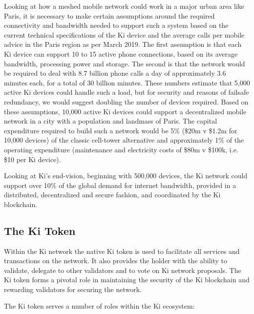 Looking at how a meshed mobile network could work in a major urban area like Paris, it is necessary to make certain assumptions around the required connectivity and bandwidth needed to support such a system based on the current technical specifications of the Ki device and the average calls per mobile advice in the Paris region as per March 2019. The first assumption is that each Ki device can support 10 to 15 active phone connections, based on its average bandwidth, processing power and storage. The second is that the network would be required to deal with 8.7 billion phone calls a day of approximately 3.6 minutes each, for a total of 30 billion minutes. These numbers estimate that 5,000 active Ki devices could handle such a load, but for security and reasons of failsafe redundancy, we would suggest doubling the number of devices required. Based on these assumptions, 10,000 active Ki devices could support a decentralized mobile network in a city with a population and landmass of Paris. The capital expenditure required to build such a network would be 5\% (\$20m v \$1.2m for 10,000 devices) of the classic cell-tower alternative and approximately 1\% of the operating expenditure (maintenance and electricity costs of \$80m v \$100k, i.e. \$10 per Ki device).

Looking at Ki's end-vision, beginning with 500,000 devices, the Ki network could support over 10\% of the global demand for internet bandwidth,  provided in a distributed, decentralized and secure fashion, and coordinated by the Ki blockchain.




\subsection{The Ki Token}
\label{sec:kiecosystemtoken}
Within the Ki network the native Ki token is used to facilitate all services and transactions on the network. It also provides the holder with the ability to validate, delegate to other validators and to vote on Ki network proposals. The Ki token forms a pivotal role in maintaining the security of the Ki blockchain and rewarding validators for securing the network.


The Ki token serves a number of roles within the Ki ecosystem:


